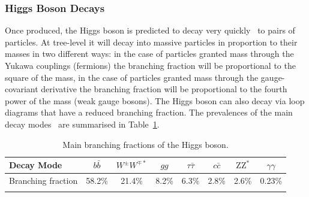 \subsubsection{Higgs Boson Decays}
Once produced, the Higgs boson is predicted to decay very quickly~\cite{HiggsLifetime} to pairs of particles. At tree-level it will decay into massive particles in proportion to their masses in two different ways: in the case of particles granted mass through the Yukawa couplings (fermions) the branching fraction will be proportional to the square of the mass, in the case of particles granted mass through the gauge-covariant derivative the branching fraction will be proportional to the fourth power of the mass (weak gauge bosons). 
The Higgs boson can also decay via loop diagrams that have a reduced branching fraction. The prevalences of the main decay modes~\cite{HiggsBRs} are summarised in Table~\ref{tab:theory:higgs_branching_ratios}.
\begin{table}[h!]
    \centering
\renewcommand{\arraystretch}{1.3}
\begin{tabular}{ l | c c c c c c c}
    \thickhline
    Decay Mode & $b\bar{b}$ & $W^{\pm}W^{\mp*}$ & $gg$ & $\tau\bar{\tau}$ & $c\bar{c}$ & $\mathrm{ZZ}^{*}$ & $\gamma\gamma$ \\
    \hline
    Branching fraction & 58.2\% & 21.4\% & 8.2\% & 6.3\% & 2.8\% & 2.6\% & 0.23\% \\
    \thickhline
\end{tabular}%
\caption{Main branching fractions of the Higgs boson.}
 \label{tab:theory:higgs_branching_ratios}
\end{table}

